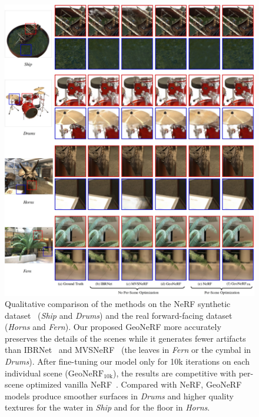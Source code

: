 \begin{figure}[!t]
    \begin{center}
        \includegraphics[width=1.0\linewidth]{images/chapter3/figures/Qualitative.jpg}
    \end{center}
   \caption{Qualitative comparison of the methods on the NeRF synthetic dataset~\cite{martin2021nerf} (\textit{Ship} and \textit{Drums}) and the real forward-facing dataset~\cite{mildenhall2019llff} (\textit{Horns} and \textit{Fern}). Our proposed GeoNeRF more accurately preserves the details of the scenes while it generates fewer artifacts than IBRNet~\cite{wang2021ibrnet} and MVSNeRF~\cite{chen2021mvsnerf} (\eg the leaves in \textit{Fern} or the cymbal in \textit{Drums}). After fine-tuning our model only for 10k iterations on each individual scene ($\text{GeoNeRF}_{\text{10k}}$), the results are competitive with per-scene optimized vanilla NeRF~\cite{mildenhall2020nerf}. Compared with NeRF, GeoNeRF models produce smoother surfaces in \textit{Drums} and higher quality textures for the water in \textit{Ship} and for the floor in \textit{Horns}.}
    \label{fig:c3_qualitative}
\end{figure}

